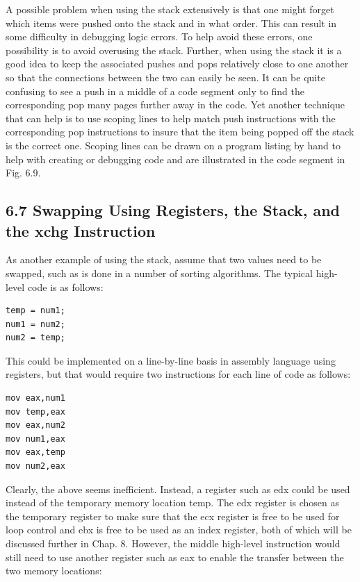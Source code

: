 \documentclass[10pt]{article}
\begin{document}
A possible problem when using the stack extensively is that one might forget which items were pushed onto the stack and in what order. This can result in some difficulty in debugging logic errors. To help avoid these errors, one possibility is to avoid overusing the stack. Further, when using the stack it is a good idea to keep the associated pushes and pops relatively close to one another so that the connections between the two can easily be seen. It can be quite confusing to see a push in a middle of a code segment only to find the corresponding pop many pages further away in the code. Yet another technique that can help is to use scoping lines to help match push instructions with the corresponding pop instructions to insure that the item being popped off the stack is the correct one. Scoping lines can be drawn on a program listing by hand to help with creating or debugging code and are illustrated in the code segment in Fig. 6.9.

\subsection*{6.7 Swapping Using Registers, the Stack, and the xchg Instruction}
As another example of using the stack, assume that two values need to be swapped, such as is done in a number of sorting algorithms. The typical high-level code is as follows:

\begin{verbatim}
temp = num1;
num1 = num2;
num2 = temp;
\end{verbatim}

This could be implemented on a line-by-line basis in assembly language using registers, but that would require two instructions for each line of code as follows:

\begin{verbatim}
mov eax,num1
mov temp,eax
mov eax,num2
mov num1,eax
mov eax,temp
mov num2,eax
\end{verbatim}

Clearly, the above seems inefficient. Instead, a register such as edx could be used instead of the temporary memory location temp. The edx register is chosen as the temporary register to make sure that the ecx register is free to be used for loop control and ebx is free to be used as an index register, both of which will be discussed further in Chap. 8. However, the middle high-level instruction would still need to use another register such as eax to enable the transfer between the two memory locations:
\end{document}
